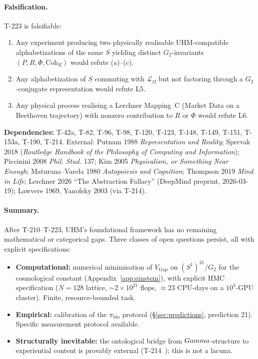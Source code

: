 \paragraph{Falsification.} T-223 is falsifiable:
\begin{enumerate}[leftmargin=2em,nosep]
  \item[F1:] Any experiment producing two physically realisable
        UHM-compatible alphabetizations of the same $S$ yielding
        distinct $G_2$-invariants $(P, R, \Phi, \mathrm{Coh}_E)$
        would refute (a)--(c).
  \item[F2:] Any alphabetization of $S$ commuting with
        $\mathcal L_\Omega$ but not factoring through a
        $G_2$-conjugate representation would refute L5.
  \item[F3:] Any physical process realising a Lerchner Mapping~C
        (Market Data on a Beethoven trajectory) with nonzero
        contribution to $R$ or $\Phi$ would refute L6.
\end{enumerate}

\textbf{Dependencies:} T-42a, T-82, T-96, T-98, T-120, T-123,
T-148, T-149, T-151, T-153a, T-190, T-214. External: Putnam 1988
\emph{Representation and Reality}; Sprevak 2018
(\emph{Routledge Handbook of the Philosophy of Computing and
Information}); Piccinini 2008
\emph{Phil. Stud.} 137; Kim 2005 \emph{Physicalism, or
Something Near Enough}; Maturana--Varela 1980
\emph{Autopoiesis and Cognition}; Thompson 2019 \emph{Mind in
Life}; Lerchner 2026 ``The Abstraction Fallacy'' (DeepMind
preprint, 2026-03-19); Lawvere 1969, Yanofsky 2003 (via T-214).

\paragraph{Summary.}
After T-210--T-223, UHM's foundational framework has no remaining
mathematical or categorical gaps. Three classes of open questions
persist, all with explicit specifications:
\begin{itemize}[leftmargin=2em,nosep]
  \item \textbf{Computational:} numerical minimisation of
        $V_{\mathrm{Gap}}$ on $(S^1)^{21}/G_2$ for the cosmological
        constant (Appendix~\ref{app:einstein}), with explicit HMC
        specification ($N = 128$ lattice, $\sim 2 \times 10^{21}$
        flops, $\approx 23$ CPU-days on a $10^3$-GPU cluster).
        Finite, resource-bounded task.
  \item \textbf{Empirical:} calibration of the $\pi_{\mathrm{bio}}$
        protocol (\S\ref{sec:predictions}, prediction 21). Specific
        measurement protocol available.
  \item \textbf{Structurally inevitable:} the ontological bridge from
        $Gamma$-structure to experiential content is provably external
        (T-214~); this is not a lacuna.
\end{itemize}

